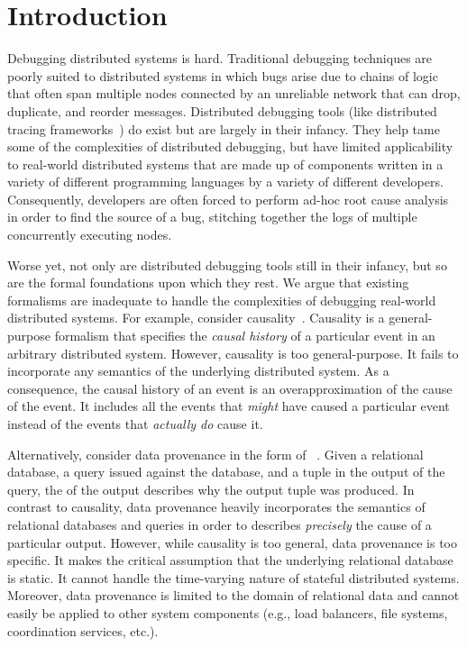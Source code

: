 \section{Introduction}
Debugging distributed systems is hard. Traditional debugging techniques are
poorly suited to distributed systems in which bugs arise due to chains of logic
that often span multiple nodes connected by an unreliable network that can
drop, duplicate, and reorder messages. Distributed debugging tools (like
distributed tracing frameworks~\cite{sigelman2010dapper, fonseca2007x}) do
exist but are largely in their infancy. They help tame some of the complexities
of distributed debugging, but have limited applicability to real-world
distributed systems that are made up of components written in a variety of
different programming languages by a variety of different developers.
Consequently, developers are often forced to perform ad-hoc root cause analysis
in order to find the source of a bug, stitching together the logs of multiple
concurrently executing nodes.

Worse yet, not only are distributed debugging tools still in their infancy, but
so are the formal foundations upon which they rest. We argue that existing
formalisms are inadequate to handle the complexities of debugging real-world
distributed systems. For example, consider causality~\cite{lamport1978time}.
Causality is a general-purpose formalism that specifies the \emph{causal
history} of a particular event in an arbitrary distributed system. However,
causality is too general-purpose. It fails to incorporate any semantics of the
underlying distributed system. As a consequence, the causal history of an event
is an overapproximation of the cause of the event. It includes all the events
that \emph{might} have caused a particular event instead of the events that
\emph{actually do} cause it.

Alternatively, consider data provenance in the form of
\whyprovenance{}~\cite{cheney2009provenance, buneman2001and}. Given a
relational database, a query issued against the database, and a tuple in the
output of the query, the \whyprovenance{} of the output describes why the
output tuple was produced. In contrast to causality, data provenance heavily
incorporates the semantics of relational databases and queries in order to
describes \emph{precisely} the cause of a particular output. However, while
causality is too general, data provenance is too specific. It makes the
critical assumption that the underlying relational database is static. It
cannot handle the time-varying nature of stateful distributed systems.
Moreover, data provenance is limited to the domain of relational data and
cannot easily be applied to other system components (e.g., load balancers, file
systems, coordination services, etc.).

